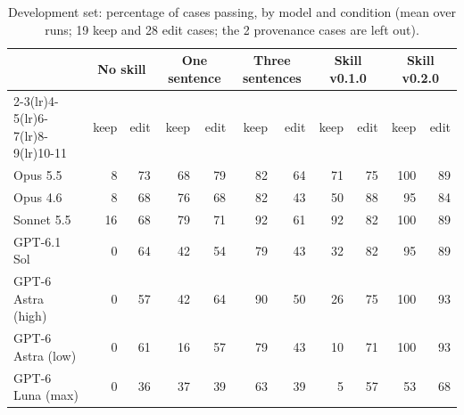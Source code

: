 \begin{table}[t]\centering\small
\caption{Development set: percentage of cases passing, by model and condition (mean over runs; 19 keep and 28 edit cases; the 2 provenance cases are left out).}\label{tab:main}
\begin{tabular}{lrrrrrrrrrr}
\toprule
 & \multicolumn{2}{c}{No skill} & \multicolumn{2}{c}{One sentence} & \multicolumn{2}{c}{Three sentences} & \multicolumn{2}{c}{Skill v0.1.0} & \multicolumn{2}{c}{Skill v0.2.0} \\
\cmidrule(lr){2-3}\cmidrule(lr){4-5}\cmidrule(lr){6-7}\cmidrule(lr){8-9}\cmidrule(lr){10-11}
 & keep & edit & keep & edit & keep & edit & keep & edit & keep & edit \\
\midrule
Opus 5.5 & 8 & 73 & 68 & 79 & 82 & 64 & 71 & 75 & 100 & 89 \\
Opus 4.6 & 8 & 68 & 76 & 68 & 82 & 43 & 50 & 88 & 95 & 84 \\
Sonnet 5.5 & 16 & 68 & 79 & 71 & 92 & 61 & 92 & 82 & 100 & 89 \\
GPT-6.1 Sol & 0 & 64 & 42 & 54 & 79 & 43 & 32 & 82 & 95 & 89 \\
GPT-6 Astra (high) & 0 & 57 & 42 & 64 & 90 & 50 & 26 & 75 & 100 & 93 \\
GPT-6 Astra (low) & 0 & 61 & 16 & 57 & 79 & 43 & 10 & 71 & 100 & 93 \\
GPT-6 Luna (max) & 0 & 36 & 37 & 39 & 63 & 39 & 5 & 57 & 53 & 68 \\
\bottomrule
\end{tabular}
\end{table}
